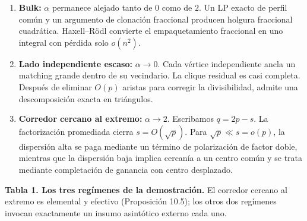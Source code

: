 \documentclass[
  11pt,
]{article}
\begin{document}
\begin{enumerate}
\def\labelenumi{\arabic{enumi}.}
\item
  \textbf{Bulk:} \(\alpha\) permanece alejado tanto de \(0\) como de \(2\). Un LP exacto de perfil común y un argumento de clonación fraccional producen holgura fraccional cuadrática. Haxell--Rödl convierte el empaquetamiento fraccional en uno integral con pérdida solo \(o(n^2)\).
\item
  \textbf{Lado independiente escaso:} \(\alpha\to0\). Cada vértice independiente ancla un matching grande dentro de su vecindario. La clique residual es casi completa. Después de eliminar \(O(p)\) aristas para corregir la divisibilidad, admite una descomposición exacta en triángulos.
\item
  \textbf{Corredor cercano al extremo:} \(\alpha\to2\). Escribamos \(q=2p-s\). La factorización promediada cierra \(s=O(\sqrt p)\). Para \(\sqrt p\ll s=o(p)\), la dispersión alta se paga mediante un término de polarización de factor doble, mientras que la dispersión baja implica cercanía a un centro común y se trata mediante completación de ganancia con centro desplazado.
\end{enumerate}

\textbf{Tabla 1. Los tres regímenes de la demostración.} El corredor cercano al extremo es elemental y efectivo (Proposición 10.5); los otros dos regímenes invocan exactamente un insumo asintótico externo cada uno.
\end{document}
